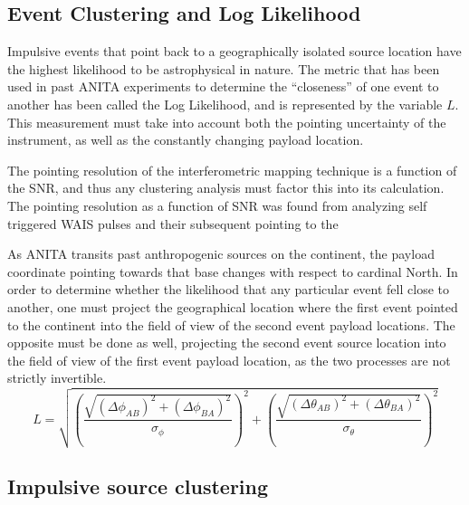 	
	\subsection{Event Clustering and Log Likelihood}
		Impulsive events that point back to a geographically isolated source location have the highest likelihood to be astrophysical in nature.  The metric that has been used in past ANITA experiments to determine the ``closeness'' of one event to another has been called the Log Likelihood, and is represented by the variable $L$.  This measurement must take into account both the pointing uncertainty of the instrument, as well as the constantly changing payload location.
		
		The pointing resolution of the interferometric mapping technique is a function of the SNR, and thus any clustering analysis must factor this into its calculation.  The pointing resolution as a function of SNR was found from analyzing self triggered WAIS pulses and their subsequent pointing to the 
		
		As ANITA transits past anthropogenic sources on the continent, the payload coordinate pointing towards that base changes with respect to cardinal North. In order to determine whether the likelihood that any particular event fell close to another, one must project the geographical location where the first event pointed to the continent into the field of view of the second event payload locations.  The opposite must be done as well, projecting the second event source location into the field of view of the first event payload location, as the two processes are not strictly invertible.
	\begin{equation}
		L = \sqrt{(\frac{\sqrt{(\Delta\phi_{AB})^2+(\Delta\phi_{BA})^2}}{{\sigma_{\phi}}})^2+(\frac{\sqrt{(\Delta\theta_{AB})^2+(\Delta\theta_{BA})^2}}{{\sigma_{\theta}}})^2}
	\end{equation}
	


	\subsection{Impulsive source clustering}
	
